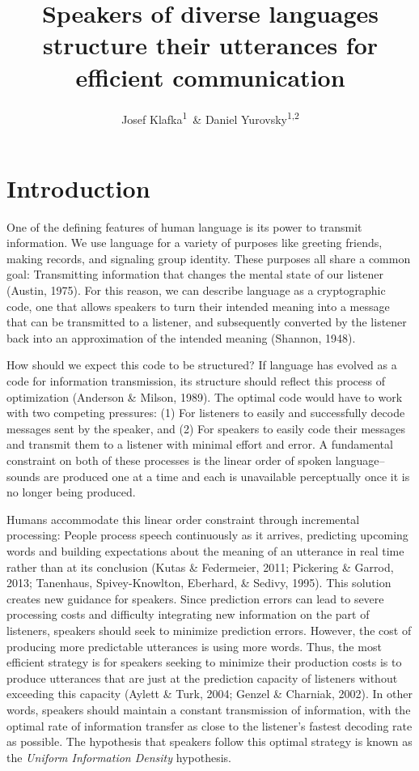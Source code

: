 \documentclass[man,floatsintext]{apa6}
\title{Speakers of diverse languages structure their utterances for efficient communication}
\author{Josef Klafka\textsuperscript{1}~\& Daniel Yurovsky\textsuperscript{1,2}}
\date{}
\affiliation{
\vspace{0.5cm}
\textsuperscript{1} Carnegie Mellon University\\\textsuperscript{2} University of Chicago}
\begin{document}
\maketitle

\hypertarget{introduction}{%
\section{Introduction}\label{introduction}}

One of the defining features of human language is its power to transmit information. We use language for a variety of purposes like greeting friends, making records, and signaling group identity. These purposes all share a common goal: Transmitting information that changes the mental state of our listener (Austin, 1975). For this reason, we can describe language as a cryptographic code, one that allows speakers to turn their intended meaning into a message that can be transmitted to a listener, and subsequently converted by the listener back into an approximation of the intended meaning (Shannon, 1948).

How should we expect this code to be structured? If language has evolved as a code for information transmission, its structure should reflect this process of optimization (Anderson \& Milson, 1989). The optimal code would have to work with two competing pressures: (1) For listeners to easily and successfully decode messages sent by the speaker, and (2) For speakers to easily code their messages and transmit them to a listener with minimal effort and error. A fundamental constraint on both of these processes is the linear order of spoken language--sounds are produced one at a time and each is unavailable perceptually once it is no longer being produced.

Humans accommodate this linear order constraint through incremental processing: People process speech continuously as it arrives, predicting upcoming words and building expectations about the meaning of an utterance in real time rather than at its conclusion (Kutas \& Federmeier, 2011; Pickering \& Garrod, 2013; Tanenhaus, Spivey-Knowlton, Eberhard, \& Sedivy, 1995). This solution creates new guidance for speakers. Since prediction errors can lead to severe processing costs and difficulty integrating new information on the part of listeners, speakers should seek to minimize prediction errors. However, the cost of producing more predictable utterances is using more words. Thus, the most efficient strategy is for speakers seeking to minimize their production costs is to produce utterances that are just at the prediction capacity of listeners without exceeding this capacity (Aylett \& Turk, 2004; Genzel \& Charniak, 2002). In other words, speakers should maintain a constant transmission of information, with the optimal rate of information transfer as close to the listener's fastest decoding rate as possible. The hypothesis that speakers follow this optimal strategy is known as the \emph{Uniform Information Density} hypothesis.
\end{document}
